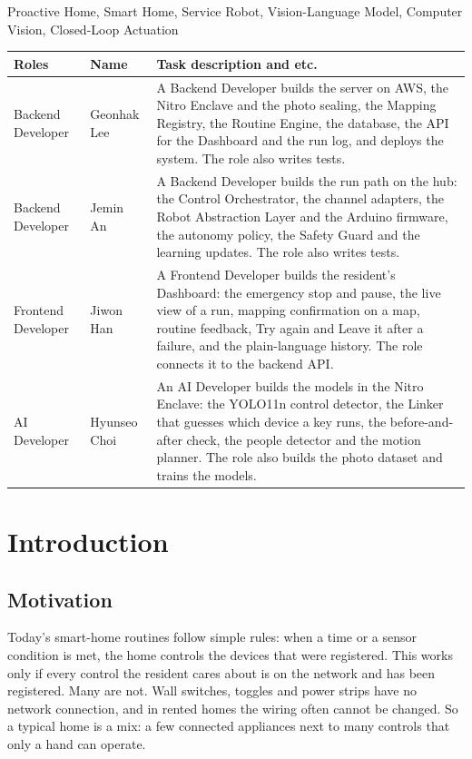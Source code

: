 \documentclass[conference]{IEEEtran}
\begin{document}
\begin{IEEEkeywords}
Proactive Home, Smart Home, Service Robot, Vision-Language Model, Computer Vision, Closed-Loop Actuation
\end{IEEEkeywords}

\vspace{4pt}
\noindent\begin{tabular}{|p{1.45cm}|p{1.45cm}|p{4.55cm}|}
\hline
\centering\textbf{\scriptsize Roles} & \centering\textbf{\scriptsize Name} & \centering\arraybackslash\textbf{\scriptsize Task description and etc.}\\
\hline
\scriptsize Backend Developer & \scriptsize Geonhak Lee & \scriptsize A Backend Developer builds the server on AWS, the Nitro Enclave and the photo sealing, the Mapping Registry, the Routine Engine, the database, the API for the Dashboard and the run log, and deploys the system. The role also writes tests.\\
\hline
\scriptsize Backend Developer & \scriptsize Jemin An & \scriptsize A Backend Developer builds the run path on the hub: the Control Orchestrator, the channel adapters, the Robot Abstraction Layer and the Arduino firmware, the autonomy policy, the Safety Guard and the learning updates. The role also writes tests.\\
\hline
\scriptsize Frontend Developer & \scriptsize Jiwon Han & \scriptsize A Frontend Developer builds the resident's Dashboard: the emergency stop and pause, the live view of a run, mapping confirmation on a map, routine feedback, Try again and Leave it after a failure, and the plain-language history. The role connects it to the backend API.\\
\hline
\scriptsize AI Developer & \scriptsize Hyunseo Choi & \scriptsize An AI Developer builds the models in the Nitro Enclave: the YOLO11n control detector, the Linker that guesses which device a key runs, the before-and-after check, the people detector and the motion planner. The role also builds the photo dataset and trains the models.\\
\hline
\end{tabular}


\section{Introduction}

\subsection{Motivation}
Today's smart-home routines follow simple rules: when a time or a sensor condition is met, the home controls the devices that were registered. This works only if every control the resident cares about is on the network and has been registered. Many are not. Wall switches, toggles and power strips have no network connection, and in rented homes the wiring often cannot be changed. So a typical home is a mix: a few connected appliances next to many controls that only a hand can operate.
\end{document}
